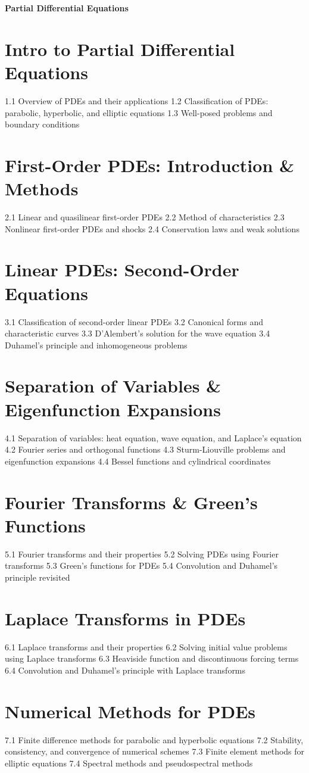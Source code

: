 {\LARGE \bf{Partial Differential Equations}}
\section{Intro to Partial Differential Equations}
1.1 Overview of PDEs and their applications
1.2 Classification of PDEs: parabolic, hyperbolic, and elliptic equations
1.3 Well-posed problems and boundary conditions
\section{First-Order PDEs: Introduction \& Methods}
2.1 Linear and quasilinear first-order PDEs
2.2 Method of characteristics
2.3 Nonlinear first-order PDEs and shocks
2.4 Conservation laws and weak solutions
\section{Linear PDEs: Second-Order Equations}
3.1 Classification of second-order linear PDEs
3.2 Canonical forms and characteristic curves
3.3 D'Alembert's solution for the wave equation
3.4 Duhamel's principle and inhomogeneous problems
\section{Separation of Variables \& Eigenfunction Expansions}
4.1 Separation of variables: heat equation, wave equation, and Laplace's equation
4.2 Fourier series and orthogonal functions
4.3 Sturm-Liouville problems and eigenfunction expansions
4.4 Bessel functions and cylindrical coordinates
\section{Fourier Transforms \& Green's Functions}
5.1 Fourier transforms and their properties
5.2 Solving PDEs using Fourier transforms
5.3 Green's functions for PDEs
5.4 Convolution and Duhamel's principle revisited
\section{Laplace Transforms in PDEs}
6.1 Laplace transforms and their properties
6.2 Solving initial value problems using Laplace transforms
6.3 Heaviside function and discontinuous forcing terms
6.4 Convolution and Duhamel's principle with Laplace transforms
\section{Numerical Methods for PDEs}
7.1 Finite difference methods for parabolic and hyperbolic equations
7.2 Stability, consistency, and convergence of numerical schemes
7.3 Finite element methods for elliptic equations
7.4 Spectral methods and pseudospectral methods

